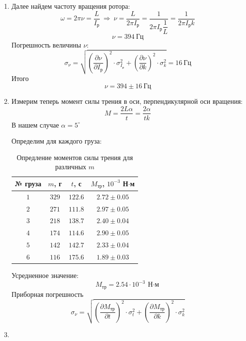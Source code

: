 \documentclass[a4paper,12pt]{article}
\begin{document}
\begin{enumerate}
	\item
	Далее найдем частоту вращения ротора:
	$$
	\omega = 2\pi\nu = \frac{L}{I_{\text{р}}}~\Rightarrow~\nu = \frac{L}{2\pi I_{\text{р}}} = \frac{1}{2\pi I_{\text{р}}\dfrac{1}{L}} = \frac{1}{2\pi I_{\text{р}} k}
	$$
	$$
	\nu = 394~\text{Гц}
	$$
	Погрешность величины $\nu$:
	$$
	\sigma_{\nu} = \sqrt{\left(\frac{\partial{\nu}}{\partial{I_{\text{р}}}}\right)^2\cdot\sigma_{I_{\text{р}}}^2 + \left(\frac{\partial{\nu}}{\partial{k}}\right)^2\cdot \sigma_k^2} = 16~\text{Гц}
	$$
	Итого
	$$
	\nu = 394\pm 16~\text{Гц}
	$$

	\item
	Измерим теперь момент силы трения в оси, перпендикулярной оси вращения:
	$$
	M = \frac{2L\alpha}{t} = \frac{2\alpha}{tk}
	$$
	В нашем случае $\alpha = 5^{\circ}$

	Определим для каждого груза:
	\begin{table}[h]
		\centering
		\begin{tabular}{|c|c|c|c|} \hline
			№ груза & $m$, г & $t$, с & $M_{\text{тр}}$, $10^{-3}$ Н$\cdot$м  \\ \hline
			$1$ & $329$ 	 & $122.6$ & $2.72\pm 0.05$ \\ \hline
			$2$ & $271$ 	 & $111.8$ & $2.97\pm 0.05$ \\ \hline
			$3$ & $218$ 	 & $138.7$ & $2.40\pm 0.04$ \\ \hline
			$4$ & $174$ 	 & $114.6$ & $2.90\pm 0.05$ \\ \hline
			$5$ & $142$ 	 & $142.7$ & $2.33\pm 0.04$ \\ \hline
			$6$ & $116$ 	 & $175.6$ & $1.89\pm 0.03$ \\ \hline
		\end{tabular}
		\caption{Опредление моментов силы трения для различных $m$}
		\label{tab:10}
	\end{table}

	Усредненное значение:
	$$
	M_{\text{тр}} = 2.54\cdot 10^{-3}~\text{Н$\cdot$м}
	$$
	Приборная погрешность
	$$
	\sigma_{\nu} = \sqrt{\left(\frac{\partial{M_{\text{тр}}}}{\partial{t}}\right)^2\cdot\sigma_{t}^2 + \left(\frac{\partial{M_{\text{тр}}}}{\partial{k}}\right)^2\cdot \sigma_k^2}
	$$

	\item


\end{enumerate}
\end{document}
